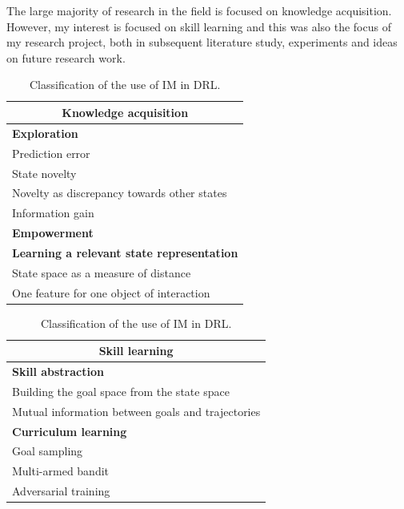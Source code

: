 \documentclass[conference]{IEEEtran}
\begin{document}
The large majority of research in the field is focused on knowledge acquisition. However, my interest is focused on skill learning and this was also the focus of my research project, both in subsequent literature study, experiments and ideas on future research work.
\begin{table}[ht]
  \centering
  \begin{subtable}[t]{0.45\columnwidth}
    \centering
    \begin{tabular}{|p{}|}
      \hline
      \multicolumn{1}{|c|}{\textbf{Knowledge acquisition}} \\
      \hline
      \hline
      \textbf{Exploration} \\
      \hline
      Prediction error \\
      State novelty \\
      Novelty as discrepancy towards other states \\
      Information gain \\
      \hline
      \hline
      \textbf{Empowerment} \\
      \hline
      \hline
      \textbf{Learning a relevant state representation} \\
      \hline
      State space as a measure of distance \\
      One feature for one object of interaction \\
      \hline
    \end{tabular}
  \end{subtable}
  \hspace{0em}
  \begin{subtable}[t]{0.45\columnwidth}
    \centering
    \begin{tabular}{|p{}|}
      \hline
      \multicolumn{1}{|c|}{\textbf{Skill learning}} \\
      \hline
      \hline
      \textbf{Skill abstraction} \\
      \hline
      Building the goal space from the state space \\
      Mutual information between goals and trajectories \\
      \hline
      \hline
      \textbf{Curriculum learning} \\
      \hline
      Goal sampling \\
      Multi-armed bandit \\
      Adversarial training \\
      \hline
    \end{tabular}
  \end{subtable}
  \caption{Classification of the use of IM in DRL.}
  \label{tab:classification}
\end{table}
\end{document}
